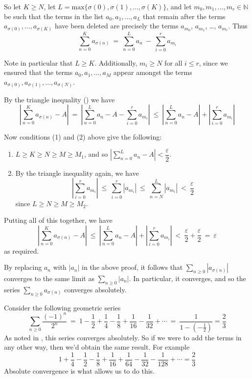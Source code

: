 \begin{cproof}
So let $K \ge N$,
let $L = \mathrm{max} \{ \sigma(0), \sigma(1), \dots, \sigma(K) \}$, and let $m_0, m_1, \dots, m_r \in \mathbb{N}$ be such that the terms in the list $a_0, a_1, \dots, a_L$ that remain after the terms $a_{\sigma(0)}, \dots, a_{\sigma(K)}$ have been deleted are precisely the terms $a_{m_0}$, $a_{m_1}$, \dots, $a_{m_r}$. Thus
\[ \sum_{n=0}^K a_{\sigma(n)} ~=~ \sum_{n=0}^L a_n ~-~ \sum_{i=0}^r a_{m_i} \]

Note in particular that $L \ge K$. Additionally, $m_i \ge N$ for all $i \le r$, since we ensured that the terms $a_0, a_1, \dots, a_M$ appear amongst the terms $a_{\sigma(0)}, a_{\sigma(1)}, \dots, a_{\sigma(N)}$.

By the triangle inequality () we have
\[ \left| \sum_{n=0}^K a_{\sigma(n)} - A \right| ~=~ \left| \sum_{n=0}^L a_n - A - \sum_{i=0}^r a_{m_i} \right| ~\le~ \left| \sum_{n=0}^L a_n - A \right| + \left| \sum_{i=0}^r a_{m_i} \right|  \]

Now conditions (1) and (2) above give the following:
\begin{enumerate}[(1)]
\item $L \ge K \ge N \ge M \ge M_1$, and so $\left| \displaystyle \sum_{n=0}^L a_n - A \right| < \dfrac{\varepsilon}{2}$.
\item By the triangle inequality again, we have
\[ \left| \sum_{i=0}^r a_{m_i} \right| ~\le~ \sum_{i=0}^r |a_{m_i}| ~\le~ \sum_{n=N}^L |a_{m_i}| ~<~ \dfrac{\varepsilon}{2} \]
since $L \ge N \ge M \ge M_2$.
\end{enumerate}

Putting all of this together, we have
\[ \left| \sum_{n=0}^K a_{\sigma(n)} - A \right| ~\le~ \left| \sum_{n=0}^L a_n - A \right| + \left| \sum_{i=0}^r a_{m_i} \right| ~<~ \dfrac{\varepsilon}{2} + \dfrac{\varepsilon}{2} ~=~ \varepsilon\] 
as required.

By replacing $a_n$ with $|a_n|$ in the above proof, it follows that $\displaystyle \sum_{n \ge 0} |a_{\sigma(n)}|$ converges to the same limit as $\displaystyle \sum_{n \ge 0} |a_n|$. In particular, it converges, and so the series $\displaystyle \sum_{n \ge 0} a_{\sigma(n)}$ converges absolutely.
\end{cproof}

\begin{example}
Consider the following geometric series
\[ \sum_{n \ge 0} \dfrac{(-1)^n}{2^n} ~=~ 1 - \dfrac{1}{2} + \dfrac{1}{4} - \dfrac{1}{8} + \dfrac{1}{16} - \dfrac{1}{32} + \cdots ~=~ \dfrac{1}{1-(-\frac{1}{2})} = \frac{2}{3} \]
As noted in , this series converges absolutely. So if we were to add the terms in any other way, then we'd obtain the same result. For example
\[ 1 + \frac{1}{4} - \frac{1}{2} - \frac{1}{8} + \frac{1}{16} + \frac{1}{64} - \frac{1}{32} - \dfrac{1}{128} + \cdots = \dfrac{2}{3} \]
Absolute convergence is what allows us to do this.
\end{example}

